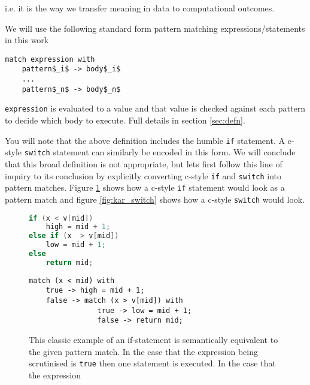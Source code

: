 \documentclass[acmsmall]{acmart}
\begin{document}
i.e. it is the way we transfer meaning in data to computational outcomes.

We will use the following standard form pattern matching expressions/statements in this work

\begin{lstlisting}
match expression with 
    pattern$_i$ -> body$_i$
    ...
    pattern$_n$ -> body$_n$
\end{lstlisting}

\lstinline{expression} is evaluated to a value and that value is checked against each pattern to decide which body to execute. Full details in section \ref{sec:defn}.

You will note that the above definition includes the humble \lstinline{if} statement. A c-style \lstinline{switch} statement can similarly be encoded in this form. We will conclude that this broad definition is not appropriate, but lets first follow this line of inquiry to its conclusion by explicitly converting c-style \lstinline{if} and \lstinline{switch} into pattern matches.  Figure \ref{fig:kar_if} shows how a c-style \lstinline{if} statement would look as a pattern match and figure \ref{fig:kar_switch} shows how a c-style \lstinline{switch} would look.

\begin{figure}
\hspace{-2em}
\begin{minipage}[t]{0.35\linewidth}
\begin{lstlisting}[language=C]
if (x < v[mid])
    high = mid + 1;
else if (x  > v[mid])
    low = mid + 1;           
else  
    return mid;
\end{lstlisting}
\end{minipage}
\begin{minipage}[t]{0.65\linewidth}
\begin{lstlisting}
match (x < mid) with
    true -> high = mid + 1;
    false -> match (x > v[mid]) with
                true -> low = mid + 1;
                false -> return mid;
\end{lstlisting}
\end{minipage}
\caption{This classic example of an if-statement \cite{kernighan_c_1988} is semantically equivalent to the given pattern match.  In the case that the expression being scrutinised is \lstinline{true} then one statement is executed.  In the case that the expression}
\label{fig:kar_if}
\end{figure}
\end{document}
